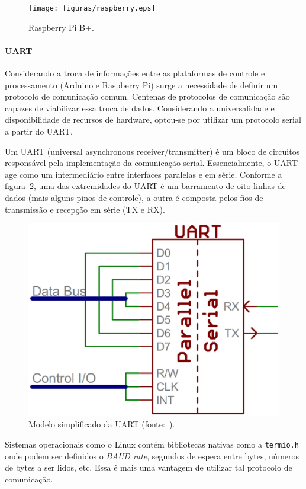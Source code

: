   \begin{figure}[!htbp]
  \begin{center}
  \texttt{[image: figuras/raspberry.eps]}
  \caption{\label{fig:raspberry}Raspberry Pi B+.}
  \end{center}
  \end{figure}

  \paragraph{UART}
	Considerando a troca de informações entre as plataformas de controle e
	processamento (Arduino e Raspberry Pi) surge a necessidade de definir
	um protocolo de comunicação comum. Centenas de protocolos de comunicação
	são capazes de viabilizar essa troca de dados. Considerando a universalidade
	e disponibilidade de recursos de hardware, optou-se por utilizar um
	protocolo serial a partir do UART.

	Um UART (universal asynchronous receiver/transmitter) é um bloco de circuitos
	responsável pela implementação da comunicação serial. Essencialmente, o UART
	age como um intermediário entre interfaces paralelas e em série. Conforme a
	figura~\ref{fig:uart}, uma das extremidades do UART é um barramento de oito linhas de
	dados (mais alguns pinos de controle), a outra é composta pelos fios de
	transmissão e recepção em série (TX e RX).

	\begin{figure}[!htbp]
	\begin{center}
	\includegraphics[width=.6\textwidth]{figuras/uart.eps}
	\caption{\label{fig:uart}Modelo simplificado da UART (fonte:~).}
	\end{center}
	\end{figure}

	Sistemas operacionais como o Linux contém bibliotecas nativas como a
	\texttt{termio.h} onde podem ser definidos o \textit{BAUD rate},
	segundos de espera entre bytes, números de bytes a ser lidos, etc.
	Essa é mais uma vantagem de utilizar tal protocolo de comunicação.

